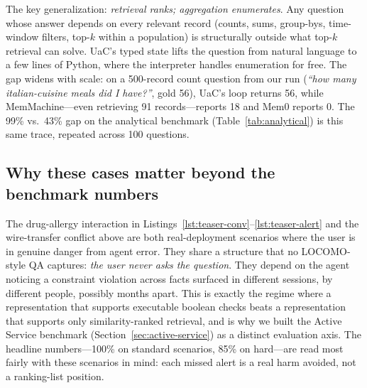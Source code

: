 The key generalization: \emph{retrieval ranks; aggregation enumerates}. Any question whose answer depends on every relevant record (counts, sums, group-bys, time-window filters, top-$k$ within a population) is structurally outside what top-$k$ retrieval can solve. UaC's typed state lifts the question from natural language to a few lines of Python, where the interpreter handles enumeration for free. The gap widens with scale: on a 500-record count question from our run (\emph{``how many italian-cuisine meals did I have?''}, gold 56), UaC's loop returns 56, while MemMachine---even retrieving 91 records---reports 18 and Mem0 reports 0. The 99\% vs.\ 43\% gap on the analytical benchmark (Table~\ref{tab:analytical}) is this same trace, repeated across 100 questions.

\subsection{Why these cases matter beyond the benchmark numbers}

The drug-allergy interaction in Listings~\ref{lst:teaser-conv}--\ref{lst:teaser-alert} and the wire-transfer conflict above are both real-deployment scenarios where the user is in genuine danger from agent error. They share a structure that no LOCOMO-style QA captures: \emph{the user never asks the question}. They depend on the agent noticing a constraint violation across facts surfaced in different sessions, by different people, possibly months apart. This is exactly the regime where a representation that supports executable boolean checks beats a representation that supports only similarity-ranked retrieval, and is why we built the Active Service benchmark (Section~\ref{sec:active-service}) as a distinct evaluation axis. The headline numbers---100\% on standard scenarios, 85\% on hard---are read most fairly with these scenarios in mind: each missed alert is a real harm avoided, not a ranking-list position.
